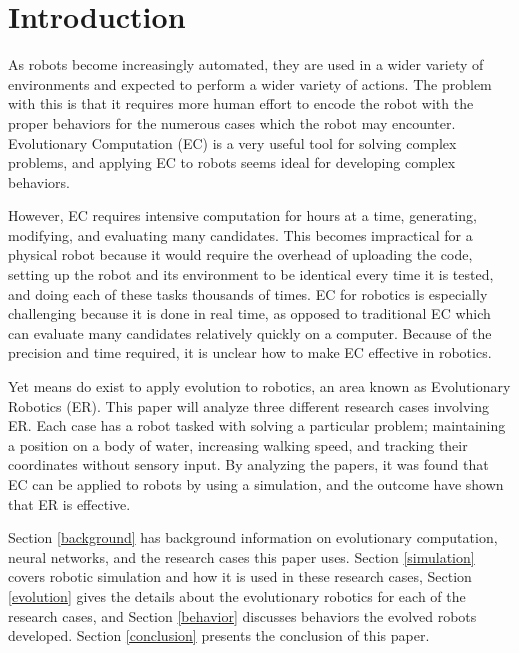 \documentclass{sig-alternate}
\begin{document}


	
\section{Introduction}
 As robots become increasingly automated, they are used in a wider variety of environments and expected to perform a wider variety of actions. The problem with this is that it requires more human effort to encode the robot with the proper behaviors for the numerous cases which the robot may encounter. Evolutionary Computation (EC) is a very useful tool for solving complex problems, and applying EC to robots seems ideal for developing complex behaviors. 
 
 However, EC requires intensive computation for hours at a time, generating, modifying, and evaluating many candidates. This becomes impractical for a physical robot because it would require the overhead of uploading the code, setting up the robot and its environment to be identical every time it is tested, and doing each of these tasks thousands of times. EC for robotics is especially challenging because it is done in real time, as opposed to traditional EC which can evaluate many candidates relatively quickly on a computer. Because of the precision and time required, it is unclear how to make EC effective in robotics.
 
 Yet means do exist to apply evolution to robotics, an area known as Evolutionary Robotics (ER). This paper will analyze three different research cases involving ER. Each case has a robot tasked with solving a particular problem; maintaining a position on a body of water, increasing walking speed, and tracking their coordinates without sensory input. By analyzing the papers, it was found that EC can be applied to robots by using a simulation, and the outcome have shown that ER is effective.

   Section \ref{background}  has  background information on evolutionary computation, neural networks, and the research cases this paper uses. Section \ref{simulation} covers robotic simulation and how it is used in these research cases, Section \ref{evolution} gives the details about the evolutionary robotics for each of the research cases, and Section \ref{behavior} discusses behaviors the evolved robots developed. Section \ref{conclusion} presents the conclusion of this paper.
 
\end{document}
